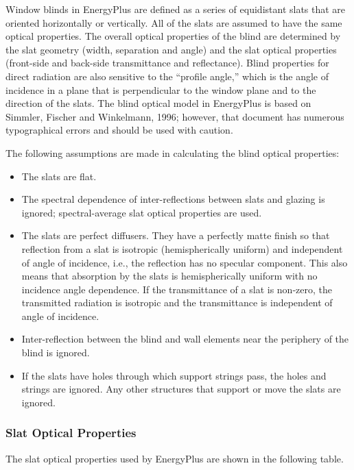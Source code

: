 Window blinds in EnergyPlus are defined as a series of equidistant slats that are oriented horizontally or vertically. All of the slats are assumed to have the same optical properties. The overall optical properties of the blind are determined by the slat geometry (width, separation and angle) and the slat optical properties (front-side and back-side transmittance and reflectance). Blind properties for direct radiation are also sensitive to the ``profile angle,'' which is the angle of incidence in a plane that is perpendicular to the window plane and to the direction of the slats. The blind optical model in EnergyPlus is based on Simmler, Fischer and Winkelmann, 1996; however, that document has numerous typographical errors and should be used with caution.

The following assumptions are made in calculating the blind optical properties:

\begin{itemize}
\item
  The slats are flat.
\item
  The spectral dependence of inter-reflections between slats and glazing is ignored; spectral-average slat optical properties are used.
\item
  The slats are perfect diffusers. They have a perfectly matte finish so that reflection from a slat is isotropic (hemispherically uniform) and independent of angle of incidence, i.e., the reflection has no specular component. This also means that absorption by the slats is hemispherically uniform with no incidence angle dependence. If the transmittance of a slat is non-zero, the transmitted radiation is isotropic and the transmittance is independent of angle of incidence.
\item
  Inter-reflection between the blind and wall elements near the periphery of the blind is ignored.
\item
  If the slats have holes through which support strings pass, the holes and strings are ignored. Any other structures that support or move the slats are ignored.
\end{itemize}

\subsubsection{Slat Optical Properties}\label{slat-optical-properties}

The slat optical properties used by EnergyPlus are shown in the following table.

